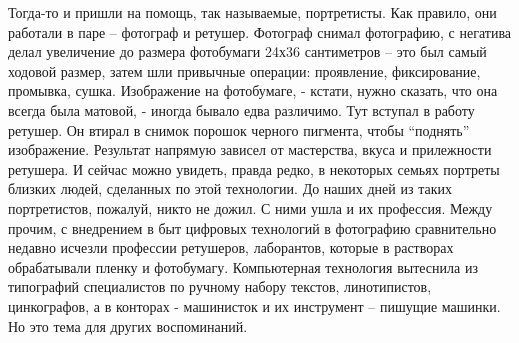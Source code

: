Тогда-то и пришли на помощь, так называемые, портретисты. Как правило, они
работали в паре – фотограф и ретушер. Фотограф снимал фотографию, с негатива
делал увеличение до размера фотобумаги 24х36 сантиметров – это был самый
ходовой размер, затем шли привычные операции: проявление, фиксирование,
промывка, сушка. Изображение на фотобумаге, - кстати, нужно сказать, что она
всегда была матовой, -  иногда бывало едва различимо. Тут вступал в работу
ретушер. Он втирал в снимок порошок черного пигмента, чтобы \enquote{поднять}
изображение. Результат напрямую зависел от мастерства, вкуса и прилежности
ретушера. И сейчас можно увидеть, правда редко, в некоторых семьях портреты
близких людей, сделанных по этой технологии. До наших дней из таких
портретистов, пожалуй, никто не дожил. С ними ушла и их профессия. Между
прочим, с внедрением в быт цифровых технологий в фотографию сравнительно
недавно исчезли профессии ретушеров, лаборантов, которые в растворах
обрабатывали пленку и фотобумагу. Компьютерная технология вытеснила из
типографий специалистов по ручному набору текстов, линотипистов, цинкографов, а
в конторах - машинисток и их инструмент – пишущие машинки. Но это тема для
других воспоминаний.
